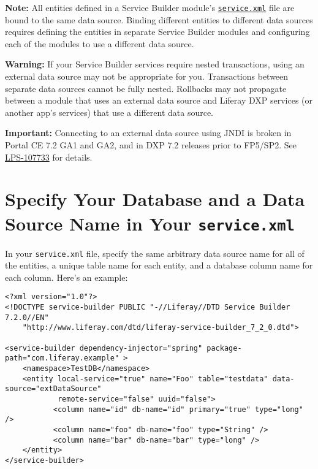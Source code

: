 \noindent\hrulefill

\textbf{Note:} All entities defined in a Service Builder module's
\href{/docs/7-2/appdev/-/knowledge_base/a/creating-the-service-xml-file}{\texttt{service.xml}}
file are bound to the same data source. Binding different entities to
different data sources requires defining the entities in separate
Service Builder modules and configuring each of the modules to use a
different data source.

\noindent\hrulefill

\noindent\hrulefill

\textbf{Warning:} If your Service Builder services require nested
transactions, using an external data source may not be appropriate for
you. Transactions between separate data sources cannot be fully nested.
Rollbacks may not propagate between a module that uses an external data
source and Liferay DXP services (or another app's services) that use a
different data source.

\noindent\hrulefill

\noindent\hrulefill

\textbf{Important:} Connecting to an external data source using JNDI is
broken in Portal CE 7.2 GA1 and GA2, and in DXP 7.2 releases prior to
FP5/SP2. See
\href{https://issues.liferay.com/browse/LPS-107733}{LPS-107733} for
details.

\noindent\hrulefill

\section{\texorpdfstring{Specify Your Database and a Data Source Name in
Your
\texttt{service.xml}}{Specify Your Database and a Data Source Name in Your service.xml}}\label{specify-your-database-and-a-data-source-name-in-your-service.xml}

In your \texttt{service.xml} file, specify the same arbitrary data
source name for all of the entities, a unique table name for each
entity, and a database column name for each column. Here's an example:

\begin{verbatim}
<?xml version="1.0"?>
<!DOCTYPE service-builder PUBLIC "-//Liferay//DTD Service Builder 7.2.0//EN"
    "http://www.liferay.com/dtd/liferay-service-builder_7_2_0.dtd">

<service-builder dependency-injector="spring" package-path="com.liferay.example" >
    <namespace>TestDB</namespace>
    <entity local-service="true" name="Foo" table="testdata" data-source="extDataSource"
            remote-service="false" uuid="false">
           <column name="id" db-name="id" primary="true" type="long" />
           <column name="foo" db-name="foo" type="String" />
           <column name="bar" db-name="bar" type="long" />
    </entity>
</service-builder>
\end{verbatim}


